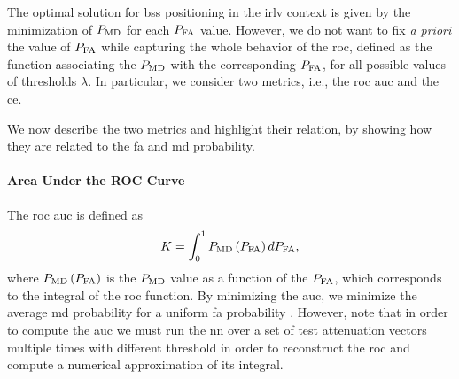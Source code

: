\documentclass[conference]{IEEEtran}
\begin{document}
The optimal solution for \acp{bs} positioning in the \ac{irlv} context is given by the minimization of $P_{\rm MD}$ for each $P_{\rm FA}$ value. However, we do not want to fix {\em a priori} the value of $P_{\rm FA}$ while capturing the whole behavior of the \ac{roc}, defined as the  function associating the $P_{\rm MD}$ with the corresponding $P_{\rm FA}$, for all possible values of thresholds $\lambda$. In particular, we consider two metrics, i.e., the   \ac{roc} \ac{auc} \cite{hanley-82} and the \ac{ce}. 

We now describe the two metrics and highlight their relation, by showing how they  are related to the \ac{fa} and \ac{md} probability.

\paragraph{Area Under the ROC Curve} The \ac{roc} \ac{auc} is defined as 
\begin{equation}
    K  = \int_{0}^{1} P_{\rm MD}\left(P_{\rm FA}\right) d P_{\rm FA},
\end{equation}
where $P_{\rm MD}\left(P_{\rm FA}\right)$ is the $P_{\rm MD}$ value as a function of the $P_{\rm FA}$, which corresponds to the integral of the \ac{roc} function. By minimizing the \ac{auc}, we minimize the average \ac{md} probability for a uniform \ac{fa} probability
. However, note that in order to compute the \ac{auc} we must run the \ac{nn} over a set of test attenuation vectors multiple times with different threshold in order to reconstruct the \ac{roc} and compute a numerical approximation of its integral.
\end{document}
